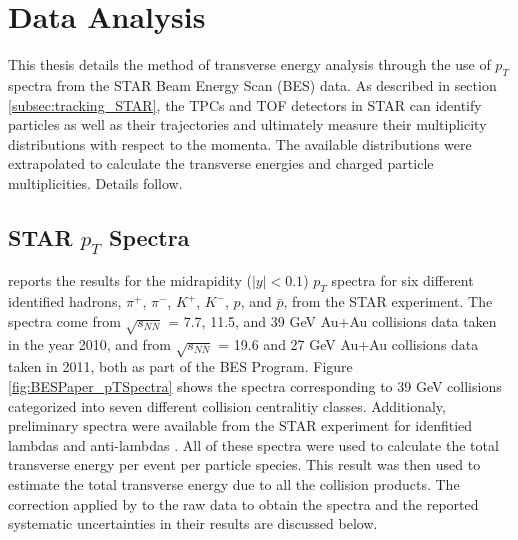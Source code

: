 \chapter{Data Analysis} \label{ch:analysis}
This thesis details the method of transverse energy analysis through the use of $p_{T}$ spectra from the STAR Beam Energy Scan (BES) data. As described in section \ref{subsec:tracking_STAR}, the TPCs and TOF detectors in STAR can identify particles as well as their trajectories and ultimately measure their multiplicity distributions with respect to the momenta. The available distributions were extrapolated to calculate the transverse energies and charged particle multiplicities. Details follow.

\section{STAR $p_{T}$ Spectra}
\citet{PhysRevC.96.044904} reports the results for the midrapidity ($\left|{y}\right| < 0.1$) $p_{T}$ spectra for six different identified hadrons, $\pi^+$, $\pi^-$, $K^+$, $K^-$, $p$, and $\bar{p}$, from the STAR experiment. The spectra come from $\sqrt{s_{NN}}$ = 7.7, 11.5, and 39 GeV Au+Au collisions data taken in the year 2010, and from $\sqrt{s_{NN}}$ = 19.6 and 27 GeV Au+Au collisions data taken in 2011, both as part of the BES Program. Figure \ref{fig:BESPaper_pTSpectra} \cite{PhysRevC.96.044904} shows the spectra corresponding to 39 GeV collisions categorized into seven different collision centralitiy classes. Additionaly, preliminary spectra were available from the STAR experiment for idenfitied lambdas and anti-lambdas \cite{YePrivateCommunication}. All of these spectra were used to calculate the total transverse energy per event per particle species. This result was then used to estimate the total transverse energy due to all the collision products. The correction applied by \citet{PhysRevC.96.044904} to the raw data to obtain the spectra and the reported systematic uncertainties in their results are discussed below.
